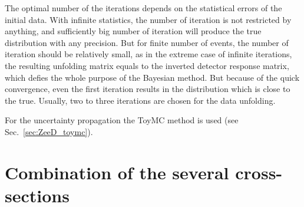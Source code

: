 The optimal number of the iterations depends on the statistical errors of the initial data. With infinite statistics, the number of iteration is not restricted by anything, and sufficiently big number of iteration will produce the true distribution with any precision. But for finite number of events, the number of iteration should be relatively small, as in the extreme case of infinite iterations, the resulting unfolding matrix equals to the inverted detector response matrix, which defies the whole purpose of the Bayesian method. But because of the quick convergence, even the first iteration results in the distribution which is close to the true. Usually, two to three iterations are chosen for the data unfolding.

For the uncertainty propagation the ToyMC method is used (see Sec.~\ref{sec:ZeeD_toymc}).

\section{Combination of the several cross-sections}
\label{sec:ZeeCS_comb}


